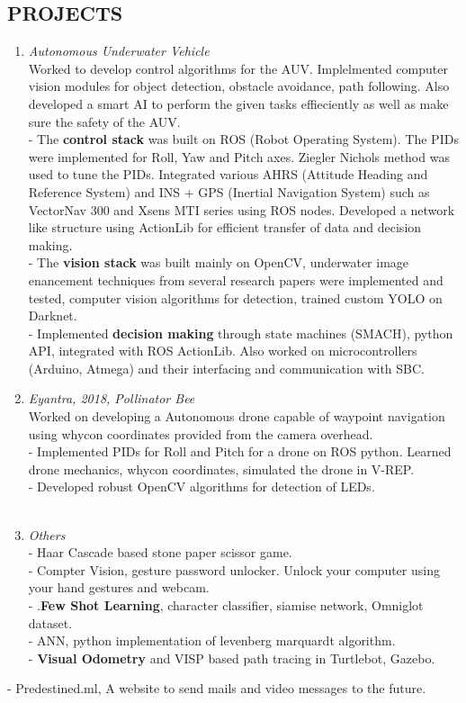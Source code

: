 \documentclass[margin]{res}
\begin{document}
\begin{resume}
\section{PROJECTS } \begin{enumerate}
  \item  {\large{\sl Autonomous Underwater Vehicle}}\\
 Worked to develop control algorithms for the AUV. Implelmented computer vision modules for object detection, obstacle avoidance, path following. Also developed a smart AI to perform the given tasks effieciently as well as make sure the safety of the AUV.\\
        - The   \textbf{control stack} was built on ROS (Robot Operating System). The PIDs were implemented for Roll, Yaw and Pitch axes. Ziegler Nichols method was used to tune the PIDs. Integrated various AHRS (Attitude Heading and Reference System) and INS + GPS (Inertial Navigation System) such as VectorNav 300 and Xsens MTI series using ROS nodes. Developed a network like structure using ActionLib for efficient transfer of data and decision making.\\
        - The   \textbf{vision stack} was built mainly on OpenCV, underwater image enancement techniques from several research papers were implemented and tested, computer vision algorithms for detection, trained custom YOLO on Darknet.\\
	- Implemented   \textbf{decision making} through state machines (SMACH), python API, integrated with ROS ActionLib. Also worked on microcontrollers (Arduino, Atmega) and their interfacing and communication with SBC.
 \item {\large{\sl Eyantra, 2018, Pollinator Bee}}\\
 Worked on developing a Autonomous drone capable of waypoint navigation using whycon coordinates provided from the camera overhead.\\
  	- Implemented PIDs for Roll and Pitch for a drone on ROS python. Learned drone mechanics, whycon coordinates, simulated the drone in V-REP. \\
	- Developed robust OpenCV algorithms for detection of LEDs. \\
\\
 \item {\large{\sl Others}}\\

  	- Haar Cascade based stone paper scissor game. \\
	- Compter Vision, gesture password unlocker. Unlock your computer using your hand gestures and webcam.\\
	- .\textbf{Few Shot Learning}, character  classifier, siamise network,  Omniglot dataset. \\
	- ANN, python implementation of levenberg marquardt algorithm.\\
	- \textbf{Visual Odometry} and VISP based path tracing in Turtlebot, Gazebo.\\
	\end{enumerate}
	- Predestined.ml, A website to send mails and video messages to the future. 



\end{resume}
\end{document}
